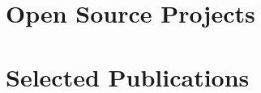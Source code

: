 \documentclass[a4paper,11pt]{article}
\begin{document}
    \section{Open Source Projects}
        \begin{itemize}
            \fossHPZ
                \cvItemizeBegin
                    \fossHPZOne
                    \fossHPZTwo
                    \fossHPZThree
                \cvItemizeEnd
            \fossConvSnn
                \cvItemizeBegin
                    \fossConvSnnOne
                    \fossConvSnnTwo
                \cvItemizeEnd
            \fossRazerDataScience
                \cvItemizeBegin
                    \fossRazerDataScienceOne
                \cvItemizeEnd
        \end{itemize}

    \section{Selected Publications}
        \publicationItemizeBegin
            \publicationInCIT
            \publicationAAAI
            \publicationSpikingTransformer
            \publicationRateCoded
            \publicationEncodingSurvey
            \seeGoogleScholar
        \publicationItemizeEnd
\end{document}
